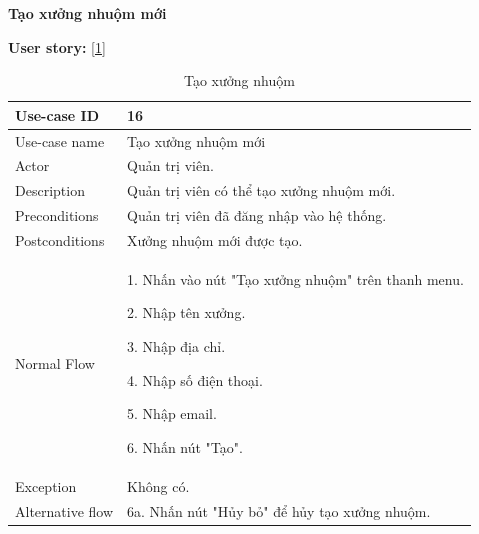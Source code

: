 \textbf{Tạo xưởng nhuộm mới}\par
\textbf{User story:} [\ref{bang16}]
\begin{table}[!htp]
    \centering
    \begin{tabular}{|m{3cm}|m{10cm}|}
    \hline 
        Use-case ID & 16\\ \hline
        Use-case name & Tạo xưởng nhuộm mới\\ \hline
        Actor & Quản trị viên.\\ \hline
        Description & Quản trị viên có thể tạo xưởng nhuộm mới.\\ \hline
        Preconditions & Quản trị viên đã đăng nhập vào hệ thống.\\ \hline
        Postconditions & Xưởng nhuộm mới được tạo.\\ \hline
        Normal Flow & 
        1. Nhấn vào nút "Tạo xưởng nhuộm" trên thanh menu.\par 
        2. Nhập tên xưởng.\par
        3. Nhập địa chỉ.\par
        4. Nhập số điện thoại.\par
        5. Nhập email.\par
        6. Nhấn nút "Tạo".
        \\ \hline
        Exception & Không có.
        \\ \hline
        Alternative flow & 
        6a. Nhấn nút "Hủy bỏ" để hủy tạo xưởng nhuộm.
        \\ 
    \hline 
    \end{tabular}
    \caption{Tạo xưởng nhuộm}
    \label{bang16}
\end{table}

